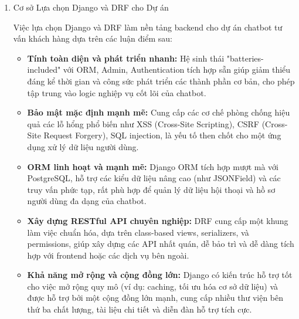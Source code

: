\begin{enumerate}[label=\arabic*., font=\bfseries]
    \item Cơ sở Lựa chọn Django và DRF cho Dự án

    Việc lựa chọn Django và DRF làm nền tảng backend cho dự án chatbot tư vấn khách hàng dựa trên các luận điểm sau:
    \begin{itemize}
        \item \textbf{Tính toàn diện và phát triển nhanh:} Hệ sinh thái "batteries-included" với ORM, Admin, Authentication tích hợp sẵn giúp giảm thiểu đáng kể thời gian và công sức phát triển các thành phần cơ bản, cho phép tập trung vào logic nghiệp vụ cốt lõi của chatbot.
        \item \textbf{Bảo mật mặc định mạnh mẽ:} Cung cấp các cơ chế phòng chống hiệu quả các lỗ hổng phổ biến như XSS (Cross-Site Scripting), CSRF (Cross-Site Request Forgery), SQL injection, là yếu tố then chốt cho một ứng dụng xử lý dữ liệu người dùng.
        \item \textbf{ORM linh hoạt và mạnh mẽ:} Django ORM tích hợp mượt mà với PostgreSQL, hỗ trợ các kiểu dữ liệu nâng cao (như JSONField) và các truy vấn phức tạp, rất phù hợp để quản lý dữ liệu hội thoại và hồ sơ người dùng đa dạng của chatbot.
        \item \textbf{Xây dựng RESTful API chuyên nghiệp:} DRF cung cấp một khung làm việc chuẩn hóa, dựa trên class-based views, serializers, và permissions, giúp xây dựng các API nhất quán, dễ bảo trì và dễ dàng tích hợp với frontend hoặc các dịch vụ bên ngoài.
        \item \textbf{Khả năng mở rộng và cộng đồng lớn:} Django có kiến trúc hỗ trợ tốt cho việc mở rộng quy mô (ví dụ: caching, tối ưu hóa cơ sở dữ liệu) và được hỗ trợ bởi một cộng đồng lớn mạnh, cung cấp nhiều thư viện bên thứ ba chất lượng, tài liệu chi tiết và diễn đàn hỗ trợ tích cực.
    \end{itemize}

\end{enumerate}



